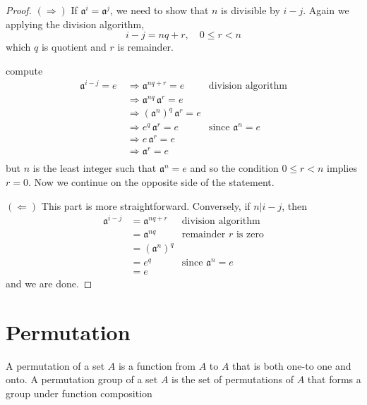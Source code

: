\begin{proof}
    $(\Rightarrow)$ If $\mathfrak{a}^i = \mathfrak{a}^j$, we need to show that $n$ is divisible by $i - j$. Again we 
    applying the division algorithm, 
    \[
        i - j = nq + r, \quad 0 \leq r < n
    \]
    which $q$ is quotient and $r$ is remainder.

    compute 
    \begin{align*}
        \mathfrak{a}^{i-j} = e \> &\Rightarrow \mathfrak{a}^{nq+r} = e & \text{division algorithm}\\
        &\Rightarrow \mathfrak{a}^{nq}\,  \mathfrak{a}^{r} = e\\
        &\Rightarrow (\mathfrak{a}^{n})^q \, \mathfrak{a}^{r} = e\\
        &\Rightarrow e^q \, \mathfrak{a}^{r} = e & \text{since } \mathfrak{a}^n = e\\
        &\Rightarrow e \, \mathfrak{a}^{r} = e\\
        &\Rightarrow \mathfrak{a}^{r} = e\\
    \end{align*}
    but $n$ is the least integer such that $\mathfrak{a}^n = e$ and so the condition $0 \leq r < n$ implies 
    $r = 0$. Now we continue on the opposite side of the statement.

    $(\Leftarrow)$ This part is more straightforward. Conversely, if $n|i-j$, then 
    \begin{align*}
        \mathfrak{a}^{i-j} &= \mathfrak{a}^{nq+r} & \text{division algorithm}\\ 
        &= \mathfrak{a}^{nq} & \text{remainder } r \text{ is zero}\\ 
        &= (\mathfrak{a}^n)^q\\
        &= e^q & \text{since } \mathfrak{a}^n = e\\
        &= e
    \end{align*}
    and we are done.
\end{proof}

\section{Permutation}

\begin{definition}
    A permutation of a set $A$ is a function from $A$ to $A$ that is both one-to
one and onto. A permutation group of a set $A$ is the set of permutations of $A$ that 
forms a group under function composition
\end{definition}

